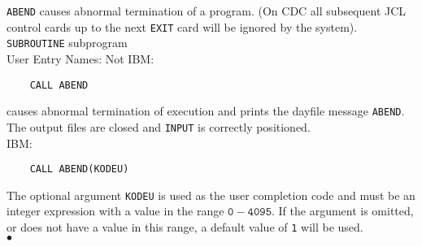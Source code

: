                                    
      
                         
 
{\tt ABEND} causes abnormal termination of a program. (On CDC all
subsequent JCL control cards up to the next {\tt EXIT} card will be
ignored by the system).
\Structure
{\tt SUBROUTINE} subprogram\\
User Entry Names: 
\Usage
Not IBM:
\begin{verbatim}
    CALL ABEND
\end{verbatim}
causes abnormal termination of execution and prints the dayfile
message {\tt ABEND}. The output files are closed and {\tt INPUT} is
correctly positioned.\\[2mm]
IBM:
\begin{verbatim}
    CALL ABEND(KODEU)
\end{verbatim}
The optional argument {\tt KODEU} is used as the user completion
code and must be an integer expression with a value in the range
$\mathtt{0-4095}$. If the argument is omitted, or does not have a value in
this range, a default value of {\tt 1} will be used.
\\ $\bullet$

